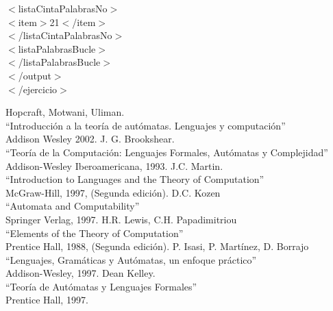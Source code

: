 \documentclass[12pt,a4paper,spanish]{book}
\begin{document}
{\indent $<$listaCintaPalabrasNo$>$\\

\indent \indent $<$item$>$21$<$/item$>$\\

\indent $<$/listaCintaPalabrasNo$>$\\

$<$listaPalabrasBucle$>$\\

$<$/listaPalabrasBucle$>$\\

$<$/output$>$\\

$<$/ejercicio$>$\\

}

\begin{thebibliography}{XXX}
\bibitem{}Hopcraft, Motwani, Uliman.\\
``Introducci\'on a la teor\'ia de aut\'omatas. Lenguajes y computaci\'on''\\
Addison Wesley 2002.
\bibitem{}J. G. Brookshear.\\
``Teor\'ia de la Computaci\'on: Lenguajes Formales, Aut\'omatas y Complejidad''\\
Addison-Wesley Iberoamericana, 1993.
\bibitem{}J.C. Martin.\\
``Introduction to Languages and the Theory of Computation''\\
McGraw-Hill, 1997, (Segunda edici\'on).
\bibitem{}D.C. Kozen\\
``Automata and Computability''\\
Springer Verlag, 1997.
\bibitem{}H.R. Lewis, C.H. Papadimitriou\\
``Elements of the Theory of Computation''\\
Prentice Hall, 1988, (Segunda edici\'on).
\bibitem{}P. Isasi, P. Mart\'inez, D. Borrajo\\
``Lenguajes, Gram\'aticas y Aut\'omatas, un enfoque pr\'actico''\\
Addison-Wesley, 1997.
\bibitem{}Dean Kelley.\\
``Teor\'ia de Aut\'omatas y Lenguajes Formales''\\
Prentice Hall, 1997.
\bibitem{}
\end{thebibliography}
\end{document}
